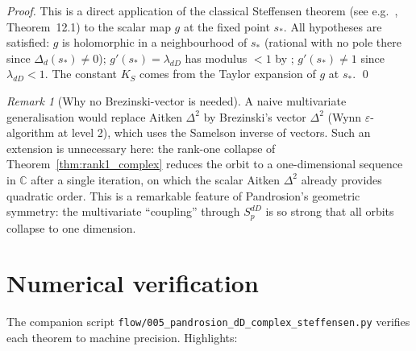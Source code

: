\documentclass[11pt,a4paper]{article}
\theoremstyle{definition}
\theoremstyle{remark}
\newtheorem{remark}[theorem]{Remark}
\newcommand{\eps}{\varepsilon}
\newcommand{\C}{\mathbb{C}}
\begin{document}
\begin{proof}
This is a direct application of the classical Steffensen theorem (see
e.g.~\cite{0pandrosion_pth}, Theorem~12.1) to the scalar map $g$ at the
fixed point $s_*$.  All hypotheses are satisfied: $g$ is holomorphic in a
neighbourhood of $s_*$ (rational with no pole there since $\Delta_d(s_*)
\neq 0$); $g'(s_*) = \lambda_{dD}$ has modulus $< 1$ by
\cite{1pandrosion_dD}; $g'(s_*) \neq 1$ since $\lambda_{dD} < 1$.  The
constant $K_S$ comes from the Taylor expansion of $g$ at $s_*$. \qed
\end{proof}

\begin{remark}[Why no Brezinski-vector is needed]
A naive multivariate generalisation would replace Aitken $\Delta^2$ by
Brezinski's vector $\Delta^2$ (Wynn $\eps$-algorithm at level 2), which
uses the Samelson inverse of vectors.  Such an extension is unnecessary
here: the rank-one collapse of Theorem~\ref{thm:rank1_complex} reduces
the orbit to a one-dimensional sequence in $\C$ after a single
iteration, on which the scalar Aitken $\Delta^2$ already provides
quadratic order.  This is a remarkable feature of Pandrosion's
geometric symmetry: the multivariate ``coupling'' through
$S_p^{dD}$ is so strong that all orbits collapse to one dimension.
\end{remark}

\section{Numerical verification}

The companion script
\texttt{flow/005\_pandrosion\_dD\_complex\_steffensen.py} verifies each
theorem to machine precision.  Highlights:
\end{document}
